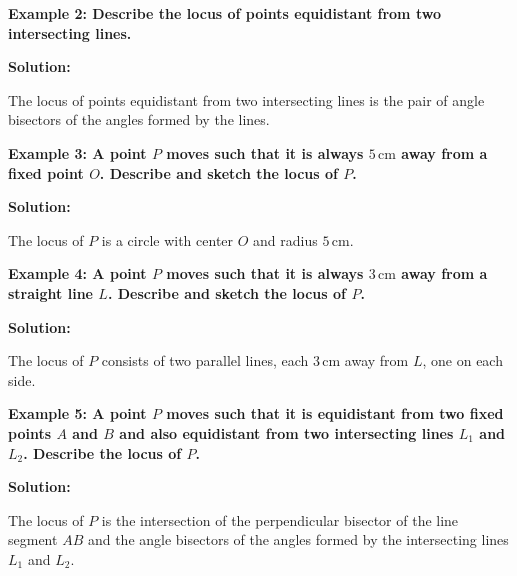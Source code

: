 \begin{flushleft}
	\textbf{Example 2: Describe the locus of points equidistant from two intersecting lines.}
	
	\vspace{0.5cm}
	\textbf{Solution:}
	\vspace{0.5cm}
	
	The locus of points equidistant from two intersecting lines is the pair of angle bisectors of the angles formed by the lines.
\end{flushleft}

\begin{flushleft}
	\textbf{Example 3: A point $P$ moves such that it is always $5 \, \text{cm}$ away from a fixed point $O$. Describe and sketch the locus of $P$.}
	
	\vspace{0.5cm}
	\textbf{Solution:}
	\vspace{0.5cm}
	
	The locus of $P$ is a circle with center $O$ and radius $5 \, \text{cm}$.
\end{flushleft}

\begin{flushleft}
	\textbf{Example 4: A point $P$ moves such that it is always $3 \, \text{cm}$ away from a straight line $L$. Describe and sketch the locus of $P$.}
	
	\vspace{0.5cm}
	\textbf{Solution:}
	\vspace{0.5cm}
	
	The locus of $P$ consists of two parallel lines, each $3 \, \text{cm}$ away from $L$, one on each side.
\end{flushleft}

\begin{flushleft}
	\textbf{Example 5: A point $P$ moves such that it is equidistant from two fixed points $A$ and $B$ and also equidistant from two intersecting lines $L_1$ and $L_2$. Describe the locus of $P$.}
	
	\vspace{0.5cm}
	\textbf{Solution:}
	\vspace{0.5cm}
	
	The locus of $P$ is the intersection of the perpendicular bisector of the line segment $AB$ and the angle bisectors of the angles formed by the intersecting lines $L_1$ and $L_2$.
\end{flushleft}